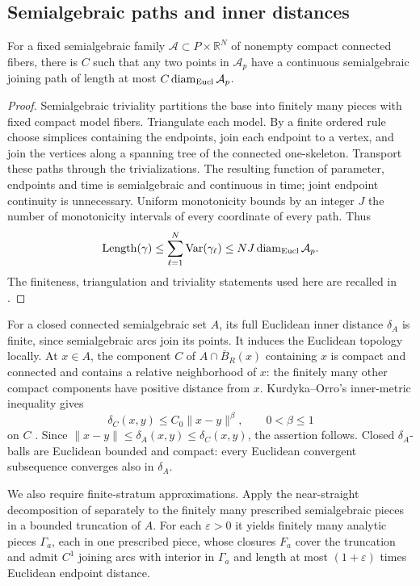 \subsection{Semialgebraic paths and inner distances}
\begin{lemma}\label{lem:uniform-semialgebraic-paths}
For a fixed semialgebraic family
$\mathcal A\subset P\times\mathbb R^N$ of nonempty compact connected
fibers, there is $C$ such that any two points in $\mathcal A_p$
have a continuous semialgebraic joining path of length at most
$C\operatorname{diam}_{\rm Eucl}\mathcal A_p$.
\end{lemma}
\begin{proof}
Semialgebraic triviality partitions the base into finitely many
pieces with fixed compact model fibers. Triangulate each model.
By a finite ordered rule choose simplices containing the endpoints,
join each endpoint to a vertex, and join the vertices along a
spanning tree of the connected one-skeleton. Transport these paths
through the trivializations. The resulting function of parameter,
endpoints and time is semialgebraic and continuous in time; joint
endpoint continuity is unnecessary.
Uniform monotonicity bounds by an integer $J$ the number of
monotonicity intervals of every coordinate of every path. Thus
\[
 \operatorname{Length}(\gamma)
 \le\sum_{\ell=1}^N\operatorname{Var}(\gamma_\ell)
 \le NJ\operatorname{diam}_{\rm Eucl}\mathcal A_p.
\]
The finiteness, triangulation and triviality statements used here
are recalled in \cite[pp.~116, 130, 133, 135]{vdD98}.
\end{proof}

For a closed connected semialgebraic set $A$, its full Euclidean
inner distance $\delta_A$ is finite, since semialgebraic arcs join
its points. It induces the Euclidean topology locally. At $x\in A$,
the component $C$ of $A\cap\overline B_R(x)$ containing $x$ is
compact and connected and contains a relative neighborhood of $x$:
the finitely many other compact components have positive distance
from $x$. Kurdyka--Orro's inner-metric inequality gives
\[
 \delta_C(x,y)\le C_0\|x-y\|^\beta,\qquad 0<\beta\le1
\]
on $C$ \cite[Corollary~2]{KO97}.
Since $\|x-y\|\le\delta_A(x,y)\le\delta_C(x,y)$, the assertion
follows. Closed $\delta_A$-balls are Euclidean bounded and compact:
every Euclidean convergent subsequence converges also in $\delta_A$.

We also require finite-stratum approximations. Apply the near-straight
decomposition of \cite[Proposition~3, pp.~176--178]{KO97} separately
to the finitely many prescribed semialgebraic pieces in a bounded
truncation of $A$. For each $\varepsilon>0$ it yields finitely many
analytic pieces $\Gamma_a$, each in one prescribed piece, whose
closures $F_a$ cover the truncation and admit $C^1$ joining arcs
with interior in $\Gamma_a$ and length at most
$(1+\varepsilon)$ times Euclidean endpoint distance.

